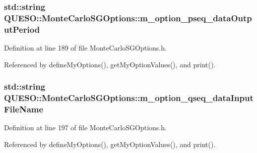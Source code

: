\hypertarget{class_q_u_e_s_o_1_1_monte_carlo_s_g_options_a38f56157a49d08a3fd6a837d95250f8b}{
\subsubsection[{m\-\_\-option\-\_\-pseq\-\_\-data\-Output\-Period}]{\setlength{\rightskip}{0pt plus 5cm}std\-::string Q\-U\-E\-S\-O\-::\-Monte\-Carlo\-S\-G\-Options\-::m\-\_\-option\-\_\-pseq\-\_\-data\-Output\-Period\hspace{0.3cm}{\ttfamily [private]}}}\label{class_q_u_e_s_o_1_1_monte_carlo_s_g_options_a38f56157a49d08a3fd6a837d95250f8b}


Definition at line 189 of file Monte\-Carlo\-S\-G\-Options.\-h.



Referenced by define\-My\-Options(), get\-My\-Option\-Values(), and print().

\hypertarget{class_q_u_e_s_o_1_1_monte_carlo_s_g_options_adfa1e97f82f761f277721e3002fa5be5}{
\subsubsection[{m\-\_\-option\-\_\-qseq\-\_\-data\-Input\-File\-Name}]{\setlength{\rightskip}{0pt plus 5cm}std\-::string Q\-U\-E\-S\-O\-::\-Monte\-Carlo\-S\-G\-Options\-::m\-\_\-option\-\_\-qseq\-\_\-data\-Input\-File\-Name\hspace{0.3cm}{\ttfamily [private]}}}\label{class_q_u_e_s_o_1_1_monte_carlo_s_g_options_adfa1e97f82f761f277721e3002fa5be5}


Definition at line 197 of file Monte\-Carlo\-S\-G\-Options.\-h.



Referenced by define\-My\-Options(), get\-My\-Option\-Values(), and print().

